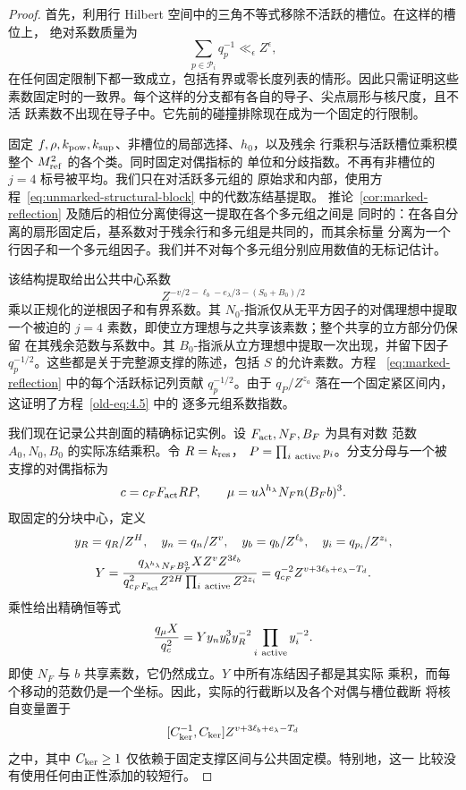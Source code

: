 \begin{proof}
首先，利用行 Hilbert 空间中的三角不等式移除不活跃的槽位。在这样的槽位上，
绝对系数质量为
\[
 \sum_{p\in\mathcal P_i}q_p^{-1}\ll_\epsilon Z^\epsilon,
\]
在任何固定限制下都一致成立，包括有界或零长度列表的情形。因此只需证明这些
素数固定时的一致界。每个这样的分支都有各自的导子、尖点扇形与核尺度，且不活
跃素数不出现在导子中。它先前的碰撞排除现在成为一个固定的行限制。

固定 \(f,\rho,k_{\rm pow},k_{\rm sup}\)、非槽位的局部选择、\(h_0\)，以及残余
行乘积与活跃槽位乘积模整个 \(M_{\rm ref}^2\) 的各个类。同时固定对偶指标的
单位和分歧指数。不再有非槽位的 \(j=4\) 标号被平均。我们只在对活跃多元组的
原始求和内部，使用方程~\eqref{eq:unmarked-structural-block} 中的代数冻结基提取。
推论~\ref{cor:marked-reflection} 及随后的相位分离使得这一提取在各个多元组之间是
同时的：在各自分离的扇形固定后，基系数对于残余行和多元组是共同的，而其余标量
分离为一个行因子和一个多元组因子。我们并不对每个多元组分别应用数值的无标记估计。

该结构提取给出公共中心系数
\[
 Z^{-v/2-\ell_b-e_\lambda/3-(S_0+B_0)/2}
\]
乘以正规化的逆根因子和有界系数。其 \(N_0\)-指派仅从无平方因子的对偶理想中提取
一个被迫的 \(j=4\) 素数，即使立方理想与之共享该素数；整个共享的立方部分仍保留
在其残余范数与系数中。其 \(B_0\)-指派从立方理想中提取一次出现，并留下因子
\(q_p^{-1/2}\)。这些都是关于完整源支撑的陈述，包括 \(S\) 的允许素数。方程
~\eqref{eq:marked-reflection} 中的每个活跃标记列贡献 \(q_p^{-1/2}\)。由于
\(q_P/Z^{z_a}\) 落在一个固定紧区间内，这证明了方程~\eqref{old-eq:4.5} 中的
逐多元组系数指数。

我们现在记录公共剖面的精确标记实例。设 \(F_{\rm act},N_F,B_F\) 为具有对数
范数 \(A_0,N_0,B_0\) 的实际冻结乘积。令 \(R=k_{\rm res}\)，
\(P=\prod_{i\ {\rm active}}p_i\)。分支分母与一个被支撑的对偶指标为
\[
 c=c_FF_{\rm act}RP,\qquad
 \mu=u\lambda^{h_\lambda}N_Fn(B_Fb)^3.
\]
取固定的分块中心，定义
\[
 \begin{gathered}
 y_R=q_R/Z^H,\quad y_n=q_n/Z^v,\quad
 y_b=q_b/Z^{\ell_b},\quad y_i=q_{p_i}/Z^{z_i},\\
 Y=\frac{q_{\lambda^{h_\lambda}N_FB_F^3}X Z^vZ^{3\ell_b}}
          {q_{c_FF_{\rm act}}^2Z^{2H}\prod_{i\ {\rm active}}Z^{2z_i}}
   =q_{c_F}^{-2}Z^{v+3\ell_b+e_\lambda-T_d}.
 \end{gathered}
\]
乘性给出精确恒等式
\begin{equation}\label{eq:reflection-actual-annuli}
 \frac{q_\mu X}{q_c^2}
       =Yy_ny_b^3y_R^{-2}\prod_{i\ {\rm active}}y_i^{-2}.
\end{equation}
即使 \(N_F\) 与 \(b\) 共享素数，它仍然成立。\(Y\) 中所有冻结因子都是其实际
乘积，而每个移动的范数仍是一个坐标。因此，实际的行截断以及各个对偶与槽位截断
将核自变量置于
\[
 [C_{\rm ker}^{-1},C_{\rm ker}]
       Z^{v+3\ell_b+e_\lambda-T_d}
\]
之中，其中 \(C_{\rm ker}\ge1\) 仅依赖于固定支撑区间与公共固定模。特别地，这一
比较没有使用任何由正性添加的较短行。


\end{proof}
